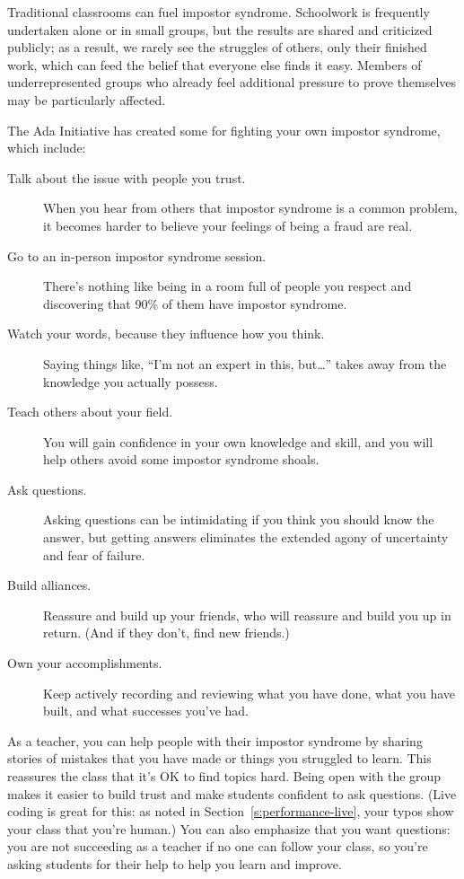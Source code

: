 Traditional classrooms can fuel impostor syndrome. Schoolwork is
frequently undertaken alone or in small groups, but the results are
shared and criticized publicly; as a result, we rarely see the struggles
of others, only their finished work, which can feed the belief that
everyone else finds it easy. Members of underrepresented groups who
already feel additional pressure to prove themselves may be particularly
affected.

The Ada Initiative has created some  for
fighting your own impostor syndrome, which include:

\begin{description}
\item[Talk about the issue with people you trust.]
When you hear from others that impostor syndrome is a common
problem, it becomes harder to believe your feelings of being a fraud
are real.
\item[Go to an in-person impostor syndrome session.]
There's nothing like being in a room full of people you respect and
discovering that 90\% of them have impostor syndrome.
\item[Watch your words, because they influence how you think.]
Saying things like, ``I'm not an expert in this, but{\ldots}''
takes away from the knowledge you actually possess.
\item[Teach others about your field.]
You will gain confidence in your own knowledge and skill, and you
will help others avoid some impostor syndrome shoals.
\item[Ask questions.]
Asking questions can be intimidating if you think you should know
the answer, but getting answers eliminates the extended agony of
uncertainty and fear of failure.
\item[Build alliances.]
Reassure and build up your friends, who will reassure and build you
up in return. (And if they don't, find new friends.)
\item[Own your accomplishments.]
Keep actively recording and reviewing what you have done, what you
have built, and what successes you've had.
\end{description}

As a teacher, you can help people with their impostor syndrome by
sharing stories of mistakes that you have made or things you struggled
to learn. This reassures the class that it's OK to find topics hard.
Being open with the group makes it easier to build trust and make
students confident to ask questions. (Live coding is great for this: as
noted in Section~\ref{s:performance-live}, your typos show your class
that you're human.) You can also emphasize that you want questions: you
are not succeeding as a teacher if no one can follow your class, so
you're asking students for their help to help you learn and improve.

